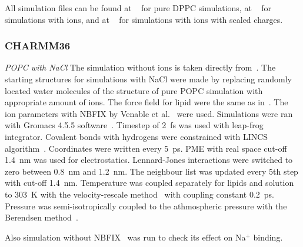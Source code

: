 \documentclass[pre,aps,floatfix,authordate1-4,twocolumn]{revtex4-1}
\begin{document}
All simulation files can be found at ~\cite{bergerOPLSDPPCfiles} for pure DPPC simulations, 
at ~\cite{bergerOPLSDPPCfiles150mMnacl, bergerOPLSDPPCfiles1000mMnacl} for simulations with ions,
and at ~\cite{DPPCBergerOPLS06NaCl150mMscaled, DPPCBergerOPLS06NaCl1000mMscaled} for simulations with ions with scaled charges. 



\subsubsection{CHARMM36}
{\it POPC with NaCl}
The simulation without ions is taken directly from~\cite{botan15,charmm36filesSHORT}. 
The starting structures for simulations with NaCl were made by replacing randomly located 
water molecules of the structure of pure POPC simulation with appropriate amount of ions.
The force field for lipid were the same as in~\cite{botan15,charmm36filesSHORT}.
The ion parameters with NBFIX by Venable et al.~\cite{venable13} were used.
Simulations were ran with Gromacs 4.5.5 software~\cite{pronk13}.
Timestep of 2~fs was used with leap-frog integrator. Covalent bonds with hydrogens were constrained with LINCS algorithm~\cite{hess97,hess07}. 
Coordinates were written every 5~ps. PME with real space cut-off 1.4~nm was used 
for electrostatics. Lennard-Jones interactions were switched to zero between 0.8~nm and 1.2~nm.
The neighbour list was updated every 5th step with cut-off 1.4~nm. Temperature was coupled separately
for lipids and solution to 303~K with the velocity-rescale method~\cite{bussi07} with coupling constant 0.2~ps.
Pressure was semi-isotropically coupled to the athmospheric pressure with the Berendsen method~\cite{berendsen84}.

Also simulation without NBFIX~\cite{venable13} was run to check its effect on Na$^+$ binding.
\end{document}
